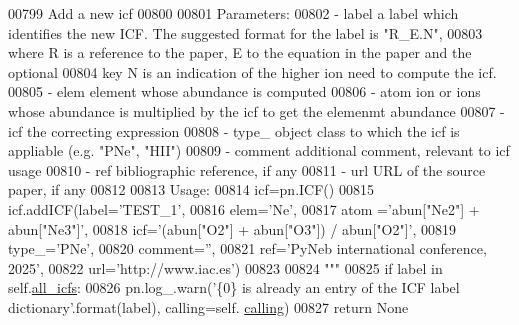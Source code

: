 \begin{DoxyCode}
{{{00799 \textcolor{stringliteral}{        Add a new icf}
00800 \textcolor{stringliteral}{        }
00801 \textcolor{stringliteral}{        Parameters:}
00802 \textcolor{stringliteral}{            - label    a label which identifies the new ICF. The suggested format for the label is "R\_E.N",
       }
00803 \textcolor{stringliteral}{                        where R is a reference to the paper, E to the equation in the paper and the
       optional }
00804 \textcolor{stringliteral}{                        key N is an indication of the higher ion need to compute the icf.  }
00805 \textcolor{stringliteral}{            - elem     element whose abundance is computed}
00806 \textcolor{stringliteral}{            - atom     ion or ions whose abundance is multiplied by the icf to get the elemenmt abundance}
00807 \textcolor{stringliteral}{            - icf      the correcting expression}
00808 \textcolor{stringliteral}{            - type\_     object class to which the icf is appliable (e.g. "PNe", "HII")}
00809 \textcolor{stringliteral}{            - comment  additional comment, relevant to icf usage}
00810 \textcolor{stringliteral}{            - ref      bibliographic reference, if any}
00811 \textcolor{stringliteral}{            - url      URL of the source paper, if any}
00812 \textcolor{stringliteral}{            }
00813 \textcolor{stringliteral}{        Usage:}
00814 \textcolor{stringliteral}{            icf=pn.ICF()}
00815 \textcolor{stringliteral}{            icf.addICF(label='TEST\_1',}
00816 \textcolor{stringliteral}{                        elem='Ne',}
00817 \textcolor{stringliteral}{                        atom ='abun["Ne2"] + abun["Ne3"]',}
00818 \textcolor{stringliteral}{                        icf='(abun["O2"] + abun["O3"]) / abun["O2"]',}
00819 \textcolor{stringliteral}{                        type\_='PNe',}
00820 \textcolor{stringliteral}{                        comment='',}
00821 \textcolor{stringliteral}{                        ref='PyNeb international conference, 2025',}
00822 \textcolor{stringliteral}{                        url='http://www.iac.es')}
00823 \textcolor{stringliteral}{}
00824 \textcolor{stringliteral}{        """}
00825         \textcolor{keywordflow}{if} label \textcolor{keywordflow}{in} self.\hyperlink{classpyneb_1_1core_1_1icf_1_1_i_c_f_a854ee87a53feb102e429e902227ce88b}{all\_icfs}:
00826             pn.log\_.warn(\textcolor{stringliteral}{'\{0\} is already an entry of the ICF label dictionary'}.format(label), calling=self.
      \hyperlink{classpyneb_1_1core_1_1icf_1_1_i_c_f_aaeb9b3827ef557a32b109baef31da77f}{calling})
00827             \textcolor{keywordflow}{return} \textcolor{keywordtype}{None}
}}}
\end{DoxyCode}
